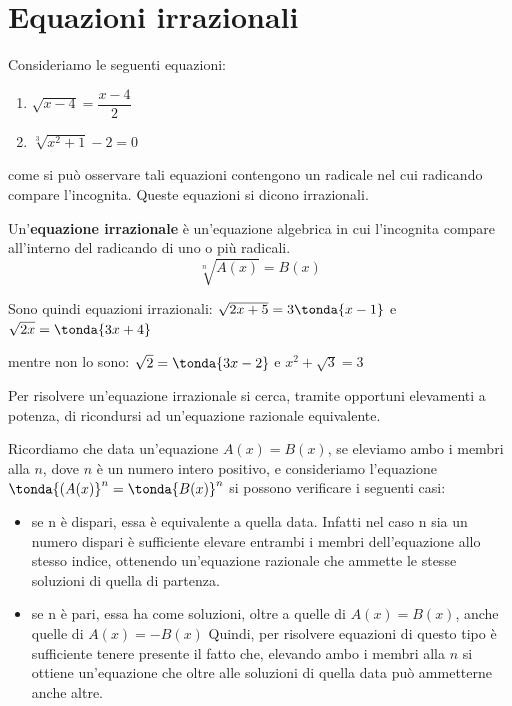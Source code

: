 \section{Equazioni irrazionali}

Consideriamo le seguenti equazioni:
\begin{enumerate}
 \item \(\sqrt{x-4} = \dfrac{x-4}{2}\)
 \item \(\sqrt[3]{x^{2}+1} -2=0\)
\end{enumerate}

come si può osservare tali equazioni contengono un radicale nel cui radicando 
compare  l'incognita.
Queste equazioni si dicono irrazionali.

\begin{definizione}
 Un'\textbf{equazione irrazionale} è un'equazione algebrica in cui l'incognita 
compare all'interno del radicando di uno o più radicali.
\[\sqrt[n]{A(x)} = B(x)\]
\end{definizione}

Sono quindi equazioni irrazionali: 
\(\sqrt{2x+5} = 3\tonda{x-1}\) \quad e \quad \(\sqrt{2x} = \tonda{3x+4}\)  

mentre non lo sono: \(\sqrt{2} = \tonda{3x-2}\) \quad e \quad 
\(x^2 + \sqrt{3} = 3\) 

Per risolvere un'equazione irrazionale si cerca, tramite opportuni elevamenti a 
potenza, di ricondursi ad un'equazione razionale equivalente.

Ricordiamo che data un'equazione \(A(x)=B(x)\), se eleviamo ambo i membri alla 
\(n\), dove \(n\) è un numero intero positivo, e consideriamo l'equazione 
\(\tonda{(A(x)}^n=\tonda{B(x)}^n\) si possono verificare i seguenti casi:
\begin{itemize}
 \item 
 se n è dispari, essa è equivalente a quella data.
Infatti nel caso n sia un numero dispari è sufficiente elevare entrambi i 
membri 
dell'equazione allo stesso indice, ottenendo  un'equazione razionale che 
ammette 
le stesse soluzioni di quella di partenza.
 \item 
 se n è pari, essa ha come soluzioni, oltre a quelle di \(A(x)=B(x)\), anche 
quelle di \(A(x) = -B(x)\)
Quindi, per risolvere equazioni di questo tipo è sufficiente tenere presente il 
fatto che, elevando ambo i membri alla \(n\) si ottiene un'equazione che 
oltre alle soluzioni di quella data può ammetterne anche altre.
\end{itemize}

